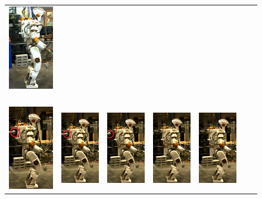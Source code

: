 \documentclass[letterpaper, 10 pt, conference]{ieeeconf}  %
\begin{document}
\begin{figure}[h]
\begin{tabular}{ccccccc}
    \includegraphics[width=0.84in]{val7z} ~\\[2ex]
     \includegraphics[width=0.84in]{val1dr} &
    \includegraphics[width=0.84in]{val2dr} &
    \includegraphics[width=0.84in]{val3dr} &
    \includegraphics[width=0.84in]{val4d} &
    \includegraphics[width=0.84in]{val5d} &

\end{tabular}
\end{figure}
\end{document}
